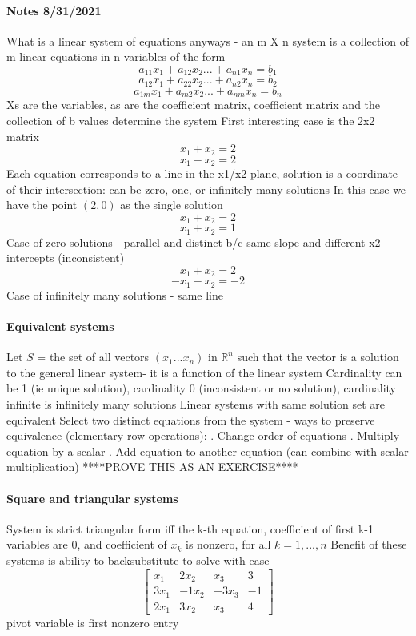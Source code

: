 \documentclass{article}
\begin{document}
\paragraph{Notes 8/31/2021}
What is a linear system of equations anyways -
an m X n system is a collection of m linear equations
in n variables of the form 
\[a_{11}x_1+a_{12}x_2...+a_{n1}x_n=b_1\]
\[a_{12}x_1+a_{22}x_2...+a_{n2}x_n=b_2\]
\[a_{1m}x_1+a_{m2}x_2...+a_{nm}x_n=b_n\]
Xs are the variables, as are the coefficient matrix, coefficient matrix and the collection of b values determine the system
\hfill \break
First interesting case is the 2x2 matrix
\[x_1+x_2=2\]
\[x_1-x_2=2\]
Each equation corresponds to a line in the x1/x2 plane,
solution is a coordinate of their intersection: 
can be zero, one, or infinitely many solutions
\hfill \break
In this case we have the point $(2,0)$ as the single solution
\[x_1+x_2=2\]
\[x_1+x_2=1\]
Case of zero solutions - parallel and distinct b/c same slope and different x2 intercepts (inconsistent)
\[x_1+x_2=2\]
\[-x_1-x_2=-2\]
Case of infinitely many solutions - same line

\paragraph{Equivalent systems}
Let $S$ = the set of all vectors $(x_1...x_n)$ in $\mathbb{R}^n$ such that the vector is a solution to the general linear system-
it is a function of the linear system
\hfill \break
Cardinality can be 1 (ie unique solution),
cardinality 0 (inconsistent or no solution),
cardinality infinite is infinitely many solutions
\hfill \break
Linear systems with same solution set are equivalent
\hfill \break
Select two distinct equations from the system - ways to preserve equivalence (elementary row operations):
\hfill {}. Change order of equations
\hfill {}. Multiply equation by a scalar
\hfill {}. Add equation to another equation (can combine with scalar multiplication) ****PROVE THIS AS AN EXERCISE****

\paragraph{Square and triangular systems}
System is strict triangular form iff the k-th equation, coefficient of first k-1 variables are 0,
and coefficient of $x_k$ is nonzero,
for all $k=1,...,n$
\hfill \break
Benefit of these systems is ability to backsubstitute to solve with ease
\[\begin{bmatrix}
    x_1 & 2x_2 & x_3 & 3\\
    3x_1 & -1x_2 & -3x_3 & -1\\
    2x_1 & 3x_2 & x_3 & 4
\end{bmatrix}\]
pivot variable is first nonzero entry
\end{document}
